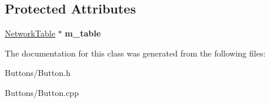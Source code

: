 \subsection*{Protected Attributes}
\begin{DoxyCompactItemize}
\item 
\hypertarget{classButton_a9efcb21a6d6ffd2b496f789d234e0ab5}{
\hyperlink{classNetworkTable}{NetworkTable} $\ast$ {\bfseries m\_\-table}}
\label{classButton_a9efcb21a6d6ffd2b496f789d234e0ab5}

\end{DoxyCompactItemize}


The documentation for this class was generated from the following files:\begin{DoxyCompactItemize}
\item 
Buttons/Button.h\item 
Buttons/Button.cpp\end{DoxyCompactItemize}
